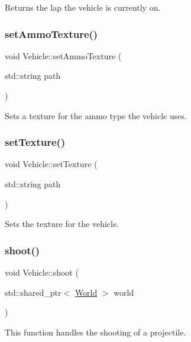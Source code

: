 Returns the lap the vehicle is currently on. \hypertarget{classVehicle_adfc1996e318be79103e6d34eb60da656}{}\label{classVehicle_adfc1996e318be79103e6d34eb60da656} 
\subsubsection{\texorpdfstring{set\+Ammo\+Texture()}{setAmmoTexture()}}
{\footnotesize\ttfamily void Vehicle\+::set\+Ammo\+Texture (\begin{DoxyParamCaption}\item[{std\+::string}]{path }\end{DoxyParamCaption})}

Sets a texture for the ammo type the vehicle uses. \hypertarget{classVehicle_ab1fbef5c7898343380c1d9aaab11c64a}{}\label{classVehicle_ab1fbef5c7898343380c1d9aaab11c64a} 
\subsubsection{\texorpdfstring{set\+Texture()}{setTexture()}}
{\footnotesize\ttfamily void Vehicle\+::set\+Texture (\begin{DoxyParamCaption}\item[{std\+::string}]{path }\end{DoxyParamCaption})\hspace{0.3cm}{\ttfamily [virtual]}}

Sets the texture for the vehicle. \hypertarget{classVehicle_a54a02d80bb7693b7e9e2b00bd1ef3217}{}\label{classVehicle_a54a02d80bb7693b7e9e2b00bd1ef3217} 
\subsubsection{\texorpdfstring{shoot()}{shoot()}}
{\footnotesize\ttfamily void Vehicle\+::shoot (\begin{DoxyParamCaption}\item[{std\+::shared\+\_\+ptr$<$ \hyperlink{classWorld}{World} $>$}]{world }\end{DoxyParamCaption})}

This function handles the shooting of a projectile. \hypertarget{classVehicle_af1ea3f326eb5ca27e1a06f4fe81832ce}{}\label{classVehicle_af1ea3f326eb5ca27e1a06f4fe81832ce} 
